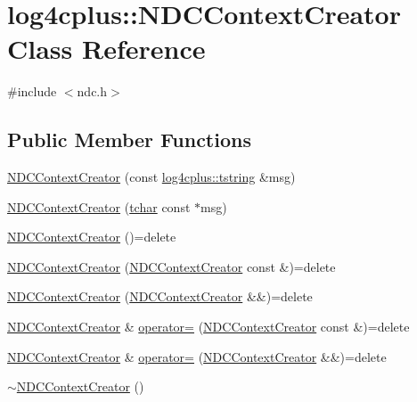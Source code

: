 \hypertarget{classlog4cplus_1_1NDCContextCreator}{\section{log4cplus\-:\-:N\-D\-C\-Context\-Creator Class Reference}
\label{classlog4cplus_1_1NDCContextCreator}
}


{\ttfamily \#include $<$ndc.\-h$>$}

\subsection*{Public Member Functions}
\begin{DoxyCompactItemize}
\item 
\hyperlink{classlog4cplus_1_1NDCContextCreator_aa652b25fa6dcc72d506cee136f595a72}{N\-D\-C\-Context\-Creator} (const \hyperlink{namespacelog4cplus_a3c9287f6ebcddc50355e29d71152117b}{log4cplus\-::tstring} \&msg)
\item 
\hyperlink{classlog4cplus_1_1NDCContextCreator_ac58a208a26e7a95f7623849231688fc0}{N\-D\-C\-Context\-Creator} (\hyperlink{namespacelog4cplus_a7b80b5711ae9e7a1ddd97dbaefbe3583}{tchar} const $\ast$msg)
\item 
\hyperlink{classlog4cplus_1_1NDCContextCreator_ad6277744f62bff10cdeea871bac25885}{N\-D\-C\-Context\-Creator} ()=delete
\item 
\hyperlink{classlog4cplus_1_1NDCContextCreator_a69825498e56f2aae518ee1de890fdee8}{N\-D\-C\-Context\-Creator} (\hyperlink{classlog4cplus_1_1NDCContextCreator}{N\-D\-C\-Context\-Creator} const \&)=delete
\item 
\hyperlink{classlog4cplus_1_1NDCContextCreator_ae5ac60f9b3edb12eb909bcc8e982fe58}{N\-D\-C\-Context\-Creator} (\hyperlink{classlog4cplus_1_1NDCContextCreator}{N\-D\-C\-Context\-Creator} \&\&)=delete
\item 
\hyperlink{classlog4cplus_1_1NDCContextCreator}{N\-D\-C\-Context\-Creator} \& \hyperlink{classlog4cplus_1_1NDCContextCreator_a3f64645f24b11448080003f87f9c3861}{operator=} (\hyperlink{classlog4cplus_1_1NDCContextCreator}{N\-D\-C\-Context\-Creator} const \&)=delete
\item 
\hyperlink{classlog4cplus_1_1NDCContextCreator}{N\-D\-C\-Context\-Creator} \& \hyperlink{classlog4cplus_1_1NDCContextCreator_a062f80f7b36ed8822642b76970425d09}{operator=} (\hyperlink{classlog4cplus_1_1NDCContextCreator}{N\-D\-C\-Context\-Creator} \&\&)=delete
\item 
\hyperlink{classlog4cplus_1_1NDCContextCreator_a02b0d0d34e3b86c146b7853ee00dd35c}{$\sim$\-N\-D\-C\-Context\-Creator} ()
\end{DoxyCompactItemize}


